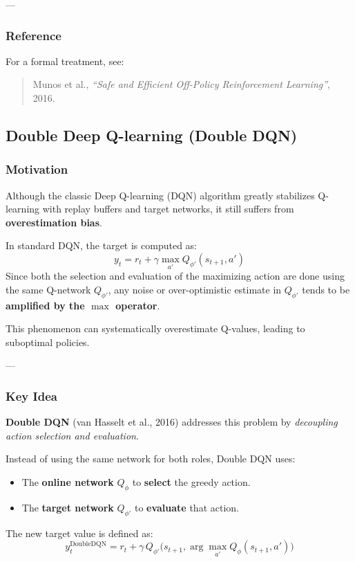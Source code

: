 \documentclass[12pt]{article}
\theoremstyle{definition} %
\theoremstyle{plain} %
\theoremstyle{remark} %
\begin{document}
\begin{CJK}{UTF8}{gbsn}
---

\subsubsection*{Reference}

For a formal treatment, see:
\begin{quote}
Munos et al., \textit{``Safe and Efficient Off-Policy Reinforcement Learning''}, 2016.
\end{quote}
\subsection{Double Deep Q-learning (Double DQN)}

\subsubsection*{Motivation}

Although the classic Deep Q-learning (DQN) algorithm greatly stabilizes Q-learning with replay buffers and target networks, 
it still suffers from \textbf{overestimation bias}.  

In standard DQN, the target is computed as:
\[
y_t = r_t + \gamma \max_{a'} Q_{\phi'}(s_{t+1}, a')
\]
Since both the selection and evaluation of the maximizing action are done using the same Q-network $Q_{\phi'}$, 
any noise or over-optimistic estimate in $Q_{\phi'}$ tends to be \textbf{amplified by the $\max$ operator}.

This phenomenon can systematically overestimate Q-values, leading to suboptimal policies.

---

\subsubsection*{Key Idea}

\textbf{Double DQN} (van Hasselt et al., 2016) addresses this problem by \emph{decoupling action selection and evaluation}.

Instead of using the same network for both roles, Double DQN uses:
\begin{itemize}
    \item The \textbf{online network} $Q_{\phi}$ to \textbf{select} the greedy action.
    \item The \textbf{target network} $Q_{\phi'}$ to \textbf{evaluate} that action.
\end{itemize}

The new target value is defined as:
\[
y_t^{\text{DoubleDQN}} = 
r_t + 
\gamma \,
Q_{\phi'} \bigl( s_{t+1}, 
\arg\max_{a'} Q_{\phi}(s_{t+1}, a') 
\bigr)
\]


\end{CJK}
\end{document}
